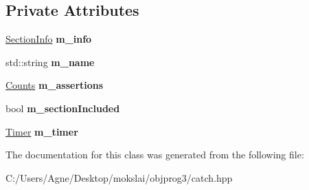 \subsection*{Private Attributes}
\begin{DoxyCompactItemize}
\item 
\mbox{\label{class_catch_1_1_section_a22f54832b33b341ae5a78807a6219af6}} 
\mbox{\hyperlink{struct_catch_1_1_section_info}{Section\+Info}} {\bfseries m\+\_\+info}
\item 
\mbox{\label{class_catch_1_1_section_a29a372077fda582bbd79fb192067f277}} 
std\+::string {\bfseries m\+\_\+name}
\item 
\mbox{\label{class_catch_1_1_section_ae0a2acc394d4bd1bc7a51a1445d25034}} 
\mbox{\hyperlink{struct_catch_1_1_counts}{Counts}} {\bfseries m\+\_\+assertions}
\item 
\mbox{\label{class_catch_1_1_section_a038bb0d5d2718df6e3ae1ece4b3d695d}} 
bool {\bfseries m\+\_\+section\+Included}
\item 
\mbox{\label{class_catch_1_1_section_a1548993afa64305a1b093391c6884b7e}} 
\mbox{\hyperlink{class_catch_1_1_timer}{Timer}} {\bfseries m\+\_\+timer}
\end{DoxyCompactItemize}


The documentation for this class was generated from the following file\+:\begin{DoxyCompactItemize}
\item 
C\+:/\+Users/\+Agne/\+Desktop/mokslai/objprog3/catch.\+hpp\end{DoxyCompactItemize}
